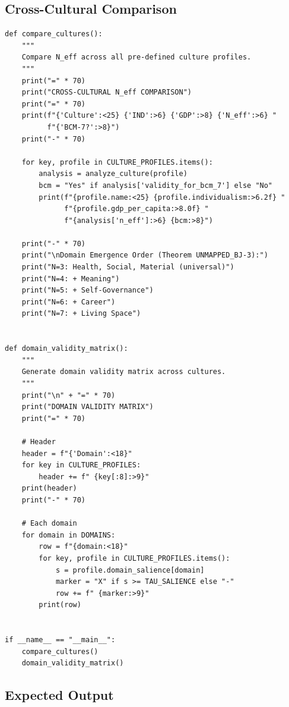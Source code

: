 \subsection{Cross-Cultural Comparison}

\begin{verbatim}
def compare_cultures():
    """
    Compare N_eff across all pre-defined culture profiles.
    """
    print("=" * 70)
    print("CROSS-CULTURAL N_eff COMPARISON")
    print("=" * 70)
    print(f"{'Culture':<25} {'IND':>6} {'GDP':>8} {'N_eff':>6} "
          f"{'BCM-7?':>8}")
    print("-" * 70)

    for key, profile in CULTURE_PROFILES.items():
        analysis = analyze_culture(profile)
        bcm = "Yes" if analysis['validity_for_bcm_7'] else "No"
        print(f"{profile.name:<25} {profile.individualism:>6.2f} "
              f"{profile.gdp_per_capita:>8.0f} "
              f"{analysis['n_eff']:>6} {bcm:>8}")

    print("-" * 70)
    print("\nDomain Emergence Order (Theorem UNMAPPED_BJ-3):")
    print("N=3: Health, Social, Material (universal)")
    print("N=4: + Meaning")
    print("N=5: + Self-Governance")
    print("N=6: + Career")
    print("N=7: + Living Space")


def domain_validity_matrix():
    """
    Generate domain validity matrix across cultures.
    """
    print("\n" + "=" * 70)
    print("DOMAIN VALIDITY MATRIX")
    print("=" * 70)

    # Header
    header = f"{'Domain':<18}"
    for key in CULTURE_PROFILES:
        header += f" {key[:8]:>9}"
    print(header)
    print("-" * 70)

    # Each domain
    for domain in DOMAINS:
        row = f"{domain:<18}"
        for key, profile in CULTURE_PROFILES.items():
            s = profile.domain_salience[domain]
            marker = "X" if s >= TAU_SALIENCE else "-"
            row += f" {marker:>9}"
        print(row)


if __name__ == "__main__":
    compare_cultures()
    domain_validity_matrix()
\end{verbatim}

\subsection{Expected Output}

